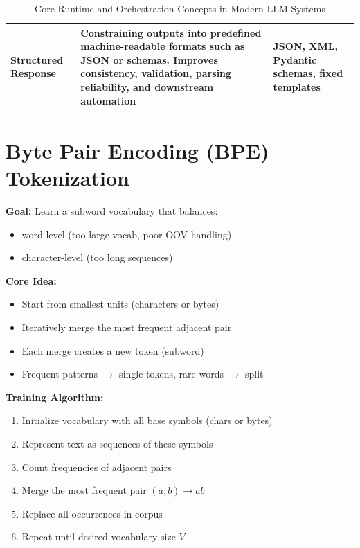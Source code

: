 \documentclass[10pt,a4paper]{article}
\begin{document}
\begin{table}[H]
\begin{tabular}{|p{3.5cm}|p{8cm}|p{4.8cm}|}
\hline

Structured Response &
Constraining outputs into predefined machine-readable formats such as JSON or schemas. Improves consistency, validation, parsing reliability, and downstream automation &
JSON, XML, Pydantic schemas, fixed templates \\

\hline

\end{tabular}

\caption{Core Runtime and Orchestration Concepts in Modern LLM Systems}
\label{tab:llm-runtime-concepts}

\end{table}

\section{Byte Pair Encoding (BPE) Tokenization}

\textbf{Goal:} Learn a subword vocabulary that balances:
\begin{itemize}
\item word-level (too large vocab, poor OOV handling)
\item character-level (too long sequences)
\end{itemize}

\textbf{Core Idea:}
\begin{itemize}
\item Start from smallest units (characters or bytes)
\item Iteratively merge the most frequent adjacent pair
\item Each merge creates a new token (subword)
\item Frequent patterns $\rightarrow$ single tokens, rare words $\rightarrow$ split
\end{itemize}

\textbf{Training Algorithm:}
\begin{enumerate}
\item Initialize vocabulary with all base symbols (chars or bytes)
\item Represent text as sequences of these symbols
\item Count frequencies of adjacent pairs
\item Merge the most frequent pair $(a, b) \rightarrow ab$
\item Replace all occurrences in corpus
\item Repeat until desired vocabulary size $V$
\end{enumerate}
\end{document}
